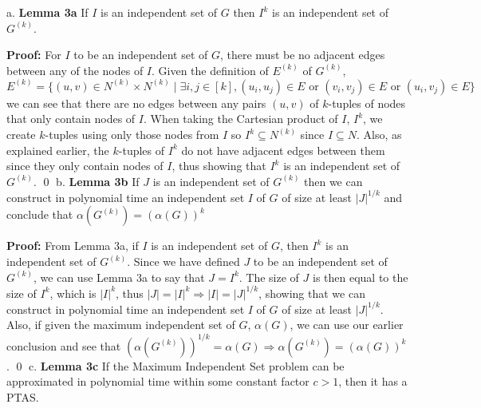 \documentclass[oneside]{homework} %
\begin{document}
{\large a.} \textbf{Lemma 3a} If $I$ is an independent set of $G$ then $I^k$ is an independent set of $G^{(k)}$.
\newline

\textbf{Proof:} For $I$ to be an independent set of $G$, there must be no adjacent edges between any of the nodes of $I$. Given the definition of $E^{(k)}$ of $G^{(k)}$, $$E^{(k)} = \{(u, v) \in N^{(k)} \times N^{(k)} \mid \exists i, j \in [k], (u_i, u_j) \in E \text{ or } (v_i, v_j) \in E \text{ or } (u_i, v_j) \in E\}$$ we can see that there are no edges between any pairs $(u, v)$ of $k$-tuples of nodes that only contain nodes of $I$. When taking the Cartesian product of $I$, $I^k$, we create $k$-tuples using only those nodes from $I$ so $I^k \subseteq N^{(k)}$ since $I \subseteq N$. Also, as explained earlier, the $k$-tuples of $I^k$ do not have adjacent edges between them since they only contain nodes of $I$, thus showing that $I^k$ is an independent set of $G^{(k)}$. \hfill\qed
\newline
\newline
{\large b.} \textbf{Lemma 3b} If $J$ is an independent set of $G^{(k)}$ then we can construct in polynomial time an independent set $I$ of $G$ of size at least $|J|^{1/k}$ and conclude that $\alpha(G^{(k)}) = (\alpha(G))^k$
\newline

\textbf{Proof:} From Lemma 3a, if $I$ is an independent set of $G$, then $I^k$ is an independent set of $G^{(k)}$. Since we have defined $J$ to be an independent set of $G^{(k)}$, we can use Lemma 3a to say that $J = I^k$. The size of $J$ is then equal to the size of $I^k$, which is $|I|^k$, thus $|J| = |I|^k \Longrightarrow |I| = |J|^{1/k}$, showing that we can construct in polynomial time an independent set $I$ of $G$ of size at least $|J|^{1/k}$. Also, if given the maximum independent set of $G$, $\alpha(G)$, we can use our earlier conclusion and see that $(\alpha(G^{(k)}))^{1/k} = \alpha(G) \Longrightarrow \alpha(G^{(k)}) = (\alpha(G))^k$. \hfill\qed
\newline
\newline
{\large c.} \textbf{Lemma 3c} If the Maximum Independent Set problem can be approximated in polynomial time within some constant factor $c > 1$, then it has a PTAS.
\newline
\end{document}
